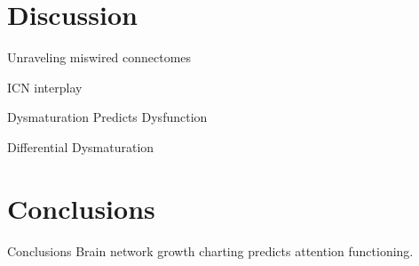 \documentclass[presentation]{beamer}
\begin{document}
\section{Discussion}
\label{sec:orgheadline29}
\begin{frame}[label={sec:orgheadline25}]{Unraveling miswired connectomes}
\end{frame}
\begin{frame}[label={sec:orgheadline26}]{ICN interplay}
\end{frame}
\begin{frame}[label={sec:orgheadline27}]{Dysmaturation Predicts Dysfunction}
\end{frame}
\begin{frame}[label={sec:orgheadline28}]{Differential Dysmaturation}
\end{frame}
\section{Conclusions}
\label{sec:orgheadline31}
\begin{frame}[label={sec:orgheadline30}]{Conclusions}
Brain network growth charting predicts attention functioning.
\end{frame}
\end{document}
